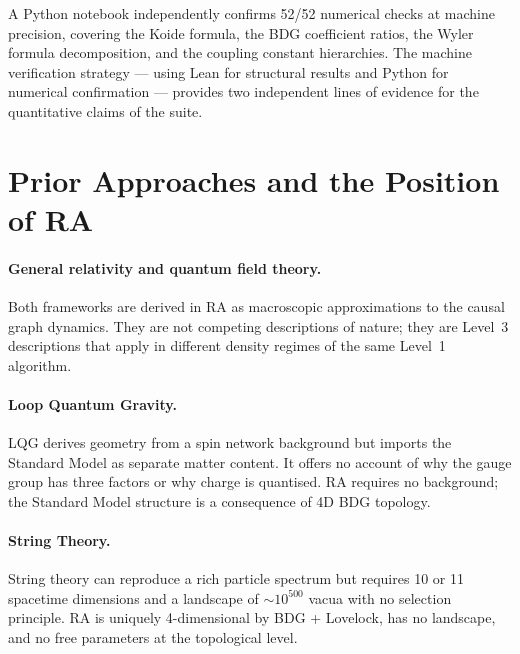 \documentclass[11pt,a4paper]{article}
\begin{document}
A Python notebook independently confirms 52/52 numerical checks at
machine precision, covering the Koide formula, the BDG coefficient
ratios, the Wyler formula decomposition, and the coupling constant
hierarchies. The machine verification strategy --- using Lean for
structural results and Python for numerical confirmation --- provides
two independent lines of evidence for the quantitative claims of the suite.

\section{Prior Approaches and the Position of RA}
\label{sec:prior}

\paragraph{General relativity and quantum field theory.}
Both frameworks are derived in RA as macroscopic approximations to the
causal graph dynamics. They are not competing descriptions of nature;
they are Level~3 descriptions that apply in different density regimes
of the same Level~1 algorithm.

\paragraph{Loop Quantum Gravity.} LQG derives geometry from a spin
network background but imports the Standard Model as separate matter
content. It offers no account of why the gauge group has three factors
or why charge is quantised. RA requires no background; the Standard
Model structure is a consequence of 4D BDG topology.

\paragraph{String Theory.} String theory can reproduce a rich particle
spectrum but requires 10 or 11 spacetime dimensions and a landscape of
$\sim 10^{500}$ vacua with no selection principle. RA is uniquely
4-dimensional by BDG + Lovelock, has no landscape, and no free
parameters at the topological level.
\end{document}
